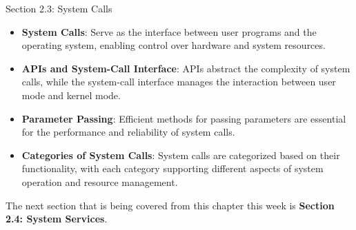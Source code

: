 \begin{notes}{Section 2.3: System Calls}
\begin{highlight}
    \begin{itemize}
        \item \textbf{System Calls}: Serve as the interface between user programs and the operating system, enabling control over hardware and system resources.
        \item \textbf{APIs and System-Call Interface}: APIs abstract the complexity of system calls, while the system-call interface manages the interaction between user mode and kernel mode.
        \item \textbf{Parameter Passing}: Efficient methods for passing parameters are essential for the performance and reliability of system calls.
        \item \textbf{Categories of System Calls}: System calls are categorized based on their functionality, with each category supporting different aspects of system operation and resource management.
    \end{itemize}
    
    \end{highlight}
\end{notes}

The next section that is being covered from this chapter this week is \textbf{Section 2.4: System Services}.


